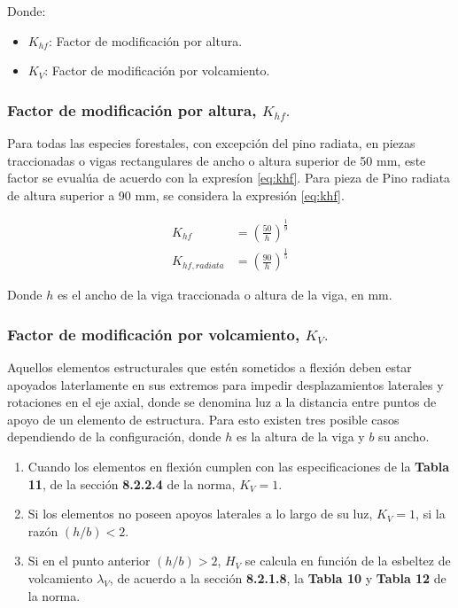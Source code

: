 Donde:
\begin{itemize}
	\item[] $K_{hf}$: Factor de modificación por altura.
	\item[] $K_V$: Factor de modificación por volcamiento.
\end{itemize}

\subsubsection{Factor de modificación por altura, $K_{hf}.$}
Para todas las especies forestales, con excepción del pino radiata, en piezas traccionadas o vigas rectangulares de ancho o altura superior de 50 mm, este factor se evualúa de acuerdo con la expresíon \ref{eq:khf}. Para pieza de Pino radiata de altura superior a 90 mm, se considera la expresión \ref{eq:khf}.

\begin{subequations}
\begin{align}
	K_{hf}&=\left(\frac{50}{h}\right)^{\frac{1}{9}} \label{eq:khf}\\
	K_{hf,radiata}&=\left(\frac{90}{h}\right)^{\frac{1}{5}} \label{eq:khfr}
\end{align}
\end{subequations}

Donde $h$ es el ancho de la viga traccionada o altura de la viga, en mm.
\subsubsection{Factor de modificación por volcamiento, $K_V.$} Aquellos elementos estructurales que estén sometidos a flexión deben estar apoyados laterlamente en sus extremos para impedir desplazamientos laterales y rotaciones en el eje axial, donde se denomina luz a la distancia entre puntos de apoyo de un elemento de estructura. Para esto existen tres posible casos dependiendo de la configuración, donde $h$ es la altura de la viga y $b$ su ancho.
\begin{enumerate}
	\item Cuando los elementos en flexión cumplen con las especificaciones de la \textbf{Tabla 11}, de la sección \textbf{8.2.2.4} de la norma, $K_V= 1$.
	\item Si los elementos no poseen apoyos laterales a lo largo de su luz, $K_V = 1$, si la razón $(h/b) < 2$.
	\item Si en el punto anterior $(h/b) > 2$, $H_V$ se calcula en función de la esbeltez de volcamiento $\lambda_V$, de acuerdo a la sección \textbf{8.2.1.8}, la \textbf{Tabla 10} y \textbf{Tabla 12} de la norma.
\end{enumerate}

